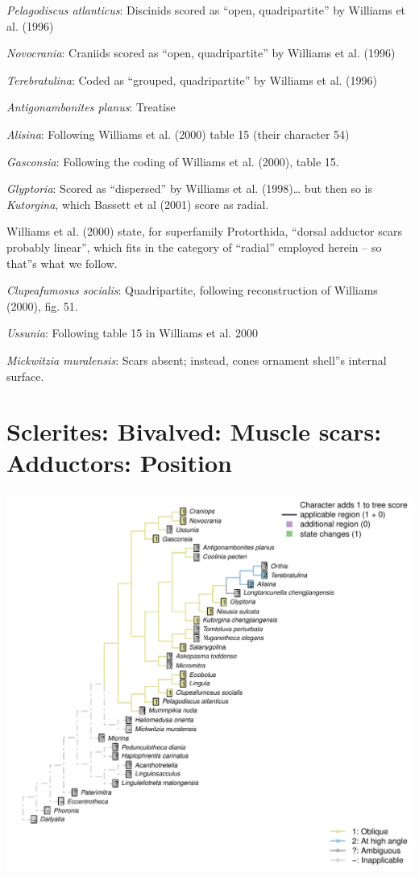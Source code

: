 \documentclass[]{book}
\theoremstyle{definition}
\theoremstyle{definition}
\theoremstyle{definition}
\theoremstyle{remark}
\begin{document}
\emph{Pelagodiscus atlanticus}: Discinids scored as ``open,
quadripartite'' by Williams et al. (1996)

\emph{Novocrania}: Craniids scored as ``open, quadripartite'' by
Williams et al. (1996)

\emph{Terebratulina}: Coded as ``grouped, quadripartite'' by Williams et
al. (1996)

\emph{Antigonambonites planus}: Treatise

\emph{Alisina}: Following Williams et al. (2000) table 15 (their
character 54)

\emph{Gasconsia}: Following the coding of Williams et al. (2000), table
15.

\emph{Glyptoria}: Scored as ``dispersed'' by Williams et al.
(1998)\ldots{} but then so is \emph{Kutorgina}, which Bassett et al
(2001) score as radial.

Williams et al. (2000) state, for superfamily Protorthida, ``dorsal
adductor scars probably linear'', which fits in the category of
``radial'' employed herein -- so that''s what we follow.

\emph{Clupeafumosus socialis}: Quadripartite, following reconstruction
of Williams (2000), fig. 51.

\emph{Ussunia}: Following table 15 in Williams et al. 2000

\emph{Mickwitzia muralensis}: Scars absent; instead, cones ornament
shell''s internal surface.

\hypertarget{sclerites-bivalved-muscle-scars-adductors-position}{%
\section*{Sclerites: Bivalved: Muscle scars: Adductors:
Position}\label{sclerites-bivalved-muscle-scars-adductors-position}}

\includegraphics{Brachiopod_phylogeny_files/figure-latex/unnamed-chunk-5-14.pdf}
\end{document}
